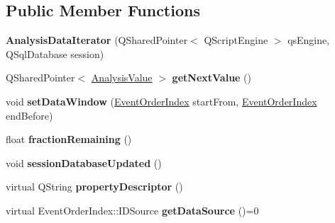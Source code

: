 \subsection*{Public Member Functions}
\begin{DoxyCompactItemize}
\item 
\hypertarget{class_picto_1_1_analysis_data_iterator_af7872e5b8bf88193c784e25a38693cfb}{{\bfseries Analysis\-Data\-Iterator} (Q\-Shared\-Pointer$<$ Q\-Script\-Engine $>$ qs\-Engine, Q\-Sql\-Database session)}\label{class_picto_1_1_analysis_data_iterator_af7872e5b8bf88193c784e25a38693cfb}

\item 
\hypertarget{class_picto_1_1_analysis_data_iterator_aacf1cb95d53adc5163982c78e5a6b970}{Q\-Shared\-Pointer$<$ \hyperlink{struct_picto_1_1_analysis_value}{Analysis\-Value} $>$ {\bfseries get\-Next\-Value} ()}\label{class_picto_1_1_analysis_data_iterator_aacf1cb95d53adc5163982c78e5a6b970}

\item 
\hypertarget{class_picto_1_1_analysis_data_iterator_aeb38d78bec733d8cfdb2e2c8f316f102}{void {\bfseries set\-Data\-Window} (\hyperlink{class_picto_1_1_event_order_index}{Event\-Order\-Index} start\-From, \hyperlink{class_picto_1_1_event_order_index}{Event\-Order\-Index} end\-Before)}\label{class_picto_1_1_analysis_data_iterator_aeb38d78bec733d8cfdb2e2c8f316f102}

\item 
\hypertarget{class_picto_1_1_analysis_data_iterator_ae2584d895c1479ac904e1e98d3eda97f}{float {\bfseries fraction\-Remaining} ()}\label{class_picto_1_1_analysis_data_iterator_ae2584d895c1479ac904e1e98d3eda97f}

\item 
\hypertarget{class_picto_1_1_analysis_data_iterator_a393935abd59771178cac3320345798bd}{void {\bfseries session\-Database\-Updated} ()}\label{class_picto_1_1_analysis_data_iterator_a393935abd59771178cac3320345798bd}

\item 
\hypertarget{class_picto_1_1_analysis_data_iterator_affae2016b57b63ba060dd4a5416265e8}{virtual Q\-String {\bfseries property\-Descriptor} ()}\label{class_picto_1_1_analysis_data_iterator_affae2016b57b63ba060dd4a5416265e8}

\item 
\hypertarget{class_picto_1_1_analysis_data_iterator_ab8eeaf05232aef48a70453860840178d}{virtual Event\-Order\-Index\-::\-I\-D\-Source {\bfseries get\-Data\-Source} ()=0}\label{class_picto_1_1_analysis_data_iterator_ab8eeaf05232aef48a70453860840178d}

\end{DoxyCompactItemize}
